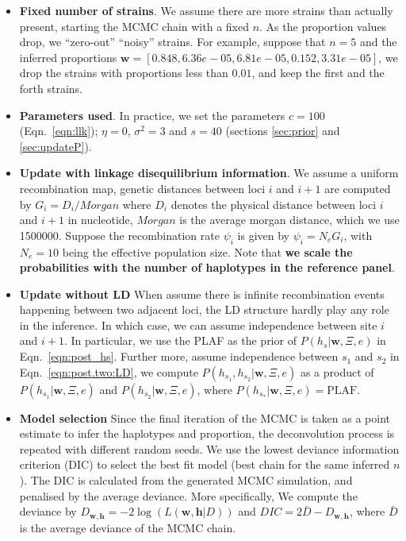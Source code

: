 \documentclass{bioinfo}
\begin{document}
\begin{itemize}
\item {\bf Fixed number of strains}. We assume there are more strains than actually present, starting the MCMC chain with a fixed $n$. As the proportion values drop, we ``zero-out'' ``noisy'' strains. For example, suppose that $n=5$ and the inferred proportions $\mathbf w= [0.848, 6.36e-05, 6.81e-05, 0.152, 3.31e-05]$, we drop the strains with proportions less than $0.01$, and keep the first and the forth strains.

\item {\bf Parameters used}. In practice, we set the parameters $c=100$ (Eqn.~\eqref{eqn:llk}); $\eta = 0$, $\sigma^2 = 3$ and $s=40$ (sections \ref{sec:prior} and \ref{sec:updateP}).

\item {\bf Update with linkage disequilibrium information}. We assume a uniform recombination map, genetic distances between loci $i$ and $i+1$ are computed by $G_i = D_i / Morgan$ where $D_i$ denotes the physical distance between loci $i$ and $i+1$ in nucleotide, $Morgan$ is the average morgan distance, which we use 1500000. Suppose the recombination rate $\psi_i$ is given by $\psi_i = N_e G_i$, with $N_e=10$ being the effective population size. Note that {\bf we scale the probabilities with the number of haplotypes in the reference panel}.

\item {\bf Update without LD} When assume there is infinite recombination events happening between two adjacent loci, the LD structure hardly play any role in the inference. In which case, we can assume independence between site $i$ and $i+1$. In particular, we use the PLAF as the prior of $P(h_s|\mathbf{w}, \Xi, e)$ in Eqn.~\eqref{eqn:post_hs}. Further more, assume independence between $s_1$ and $s_2$ in Eqn.~\eqref{eqn:post.two:LD}, we compute $P(h_{s_1},h_{s_2}|\mathbf{w},\Xi,e)$ as a product of $P(h_{s_1}|\mathbf{w},\Xi,e)$ and $P(h_{s_2}|\mathbf{w},\Xi,e)$, where $P(h_{s_*}|\mathbf{w}, \Xi, e) = \textrm{PLAF}$.

\item {\bf Model selection} Since the final iteration of the MCMC is taken as a point estimate to infer the haplotypes and proportion, the deconvolution process is repeated with different random seeds. We use the lowest deviance information criterion (DIC) to select the best fit model (best chain for the same inferred $n$). The DIC is calculated from the generated MCMC simulation, and penalised by the average deviance. More specifically, We compute the deviance by $ D_{\mathbf{w}, \mathbf{h}} = -2 \log( L (\mathbf{w}, \mathbf{h}|D) )$ and $DIC = 2\bar{D} - D_{\mathbf{w}, \mathbf{h}}$, where $\bar{D}$ is the average deviance of the MCMC chain.



\end{itemize}
\end{document}
